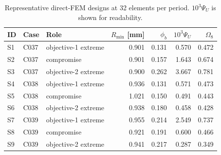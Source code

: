 \begin{table}[t]
\centering\small
\caption{Representative direct-FEM designs at 32 elements per period. $10^3\Psi_U$ is shown for readability.}
\label{tab:selected_physics_designs_fast}
\begin{tabular}{lllrrrr}
\toprule
ID & Case & Role & $R_{\min}$ [mm] & $\phi_b$ & $10^3\Psi_U$ & $\Omega_8$ \\
\midrule
S1 & C037 & objective-1 extreme & 0.901 & 0.131 & 0.570 & 0.472 \\
S2 & C037 & compromise & 0.901 & 0.157 & 1.643 & 0.674 \\
S3 & C037 & objective-2 extreme & 0.900 & 0.262 & 3.667 & 0.781 \\
S4 & C038 & objective-1 extreme & 0.936 & 0.131 & 0.571 & 0.473 \\
S5 & C038 & compromise & 1.021 & 0.150 & 0.491 & 0.443 \\
S6 & C038 & objective-2 extreme & 0.938 & 0.180 & 0.458 & 0.428 \\
S7 & C039 & objective-1 extreme & 0.955 & 0.214 & 2.549 & 0.737 \\
S8 & C039 & compromise & 0.921 & 0.191 & 0.600 & 0.466 \\
S9 & C039 & objective-2 extreme & 0.941 & 0.217 & 0.287 & 0.349 \\
\bottomrule
\end{tabular}
\end{table}
